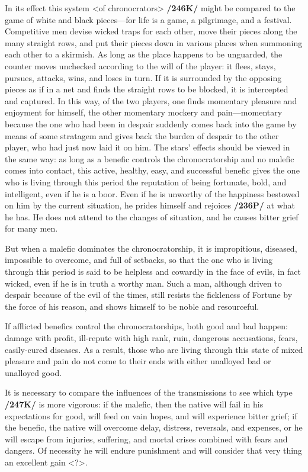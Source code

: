 In its effect this system <of chronocrators> \textbf{/246K/} might be compared to the game of white and black pieces—for life is a game, a pilgrimage, and a festival. Competitive men devise wicked traps for each other, move their pieces along the many straight rows, and put their pieces down in various places when summoning each other to a skirmish. As long as the place happens to be unguarded, the counter moves unchecked according to the will of the player: it flees, stays, pursues, attacks, wins, and loses in turn. If it is surrounded by the opposing pieces as if in a net and finds the straight rows to be blocked, it is intercepted and captured. In this way, of the two players, one finds momentary pleasure and enjoyment for himself, the other momentary mockery and pain—momentary because the one who had been in despair suddenly comes back into the game by means of some stratagem and gives back the burden of despair to the other player, who had just now laid it on him. The stars’ effects should be viewed in the same way: as long as a benefic controls the chronocratorship
and no malefic comes into contact, this active, healthy, easy, and successful benefic gives the one who is living through this period the reputation of being fortunate, bold, and intelligent, even if he is a boor.
Even if he is unworthy of the happiness bestowed on him by the current situation, he prides himself and rejoices \textbf{/236P/} at what he has. He does not attend to the changes of situation, and he causes bitter grief for many men. 

But when a malefic dominates the chronocratorship, it is impropitious, diseased, impossible to overcome, and full of setbacks, so that the one who is living through this period is said to be helpless and cowardly in the face of evils, in fact wicked, even if he is in truth a worthy man. Such a man, although driven to despair because of the evil of the times, still resists the fickleness of Fortune by the force of his
reason, and shows himself to be noble and resourceful. 

If afflicted benefics control the chronocratorships, both good and bad happen: damage with profit, ill-repute with high rank, ruin, dangerous accusations, fears, easily-cured diseases. As a result, those who are living through this state of mixed pleasure and pain do not come to their ends with either unalloyed bad or unalloyed good.

It is necessary to compare the influences of the transmissions to see which type \textbf{/247K/} is more vigorous: if the malefic, then the native will fail in his expectations for good, will feed on vain hopes, and
will experience bitter grief; if the benefic, the native will overcome delay, distress, reversals, and expenses, or he will escape from injuries, suffering, and mortal crises combined with fears and dangers. Of necessity he will endure punishment and will consider that very thing an excellent gain <?>. 

